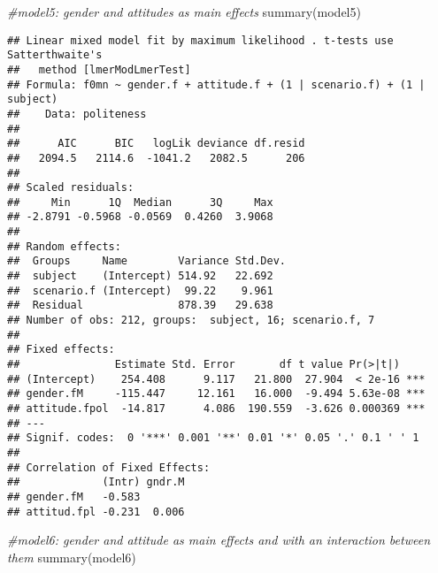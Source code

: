 \documentclass[
]{article}
\newenvironment{Shaded}{\begin{snugshade}}{\end{snugshade}}
\newcommand{\CommentTok}[1]{\textcolor[rgb]{0.56,0.35,0.01}{\textit{#1}}}
\newcommand{\FunctionTok}[1]{\textcolor[rgb]{0.00,0.00,0.00}{#1}}
\newcommand{\NormalTok}[1]{#1}
\begin{document}
\begin{Shaded}
\begin{Highlighting}[]
\CommentTok{\#model5: gender and attitudes as main effects}
\FunctionTok{summary}\NormalTok{(model5)}
\end{Highlighting}
\end{Shaded}

\begin{verbatim}
## Linear mixed model fit by maximum likelihood . t-tests use Satterthwaite's
##   method [lmerModLmerTest]
## Formula: f0mn ~ gender.f + attitude.f + (1 | scenario.f) + (1 | subject)
##    Data: politeness
## 
##      AIC      BIC   logLik deviance df.resid 
##   2094.5   2114.6  -1041.2   2082.5      206 
## 
## Scaled residuals: 
##     Min      1Q  Median      3Q     Max 
## -2.8791 -0.5968 -0.0569  0.4260  3.9068 
## 
## Random effects:
##  Groups     Name        Variance Std.Dev.
##  subject    (Intercept) 514.92   22.692  
##  scenario.f (Intercept)  99.22    9.961  
##  Residual               878.39   29.638  
## Number of obs: 212, groups:  subject, 16; scenario.f, 7
## 
## Fixed effects:
##               Estimate Std. Error       df t value Pr(>|t|)    
## (Intercept)    254.408      9.117   21.800  27.904  < 2e-16 ***
## gender.fM     -115.447     12.161   16.000  -9.494 5.63e-08 ***
## attitude.fpol  -14.817      4.086  190.559  -3.626 0.000369 ***
## ---
## Signif. codes:  0 '***' 0.001 '**' 0.01 '*' 0.05 '.' 0.1 ' ' 1
## 
## Correlation of Fixed Effects:
##             (Intr) gndr.M
## gender.fM   -0.583       
## attitud.fpl -0.231  0.006
\end{verbatim}

\begin{Shaded}
\begin{Highlighting}[]
\CommentTok{\#model6: gender and attitude as main effects and with an interaction between them}
\FunctionTok{summary}\NormalTok{(model6)}
\end{Highlighting}
\end{Shaded}
\end{document}
